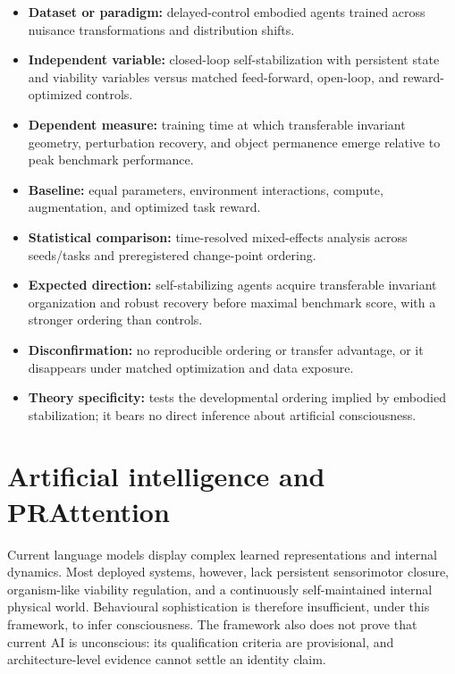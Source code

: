 \documentclass[
  11pt,
  a4paper,
]{article}
\providecommand{\tightlist}{%
  \setlength{\itemsep}{0pt}\setlength{\parskip}{0pt}}
\begin{document}
\begin{itemize}
\tightlist
\item
  \textbf{Dataset or paradigm:} delayed-control embodied agents trained
  across nuisance transformations and distribution shifts.
\item
  \textbf{Independent variable:} closed-loop self-stabilization with
  persistent state and viability variables versus matched feed-forward,
  open-loop, and reward-optimized controls.
\item
  \textbf{Dependent measure:} training time at which transferable
  invariant geometry, perturbation recovery, and object permanence
  emerge relative to peak benchmark performance.
\item
  \textbf{Baseline:} equal parameters, environment interactions,
  compute, augmentation, and optimized task reward.
\item
  \textbf{Statistical comparison:} time-resolved mixed-effects analysis
  across seeds/tasks and preregistered change-point ordering.
\item
  \textbf{Expected direction:} self-stabilizing agents acquire
  transferable invariant organization and robust recovery before maximal
  benchmark score, with a stronger ordering than controls.
\item
  \textbf{Disconfirmation:} no reproducible ordering or transfer
  advantage, or it disappears under matched optimization and data
  exposure.
\item
  \textbf{Theory specificity:} tests the developmental ordering implied
  by embodied stabilization; it bears no direct inference about
  artificial consciousness.
\end{itemize}

\section{Artificial intelligence and
PRAttention}\label{artificial-intelligence-and-prattention}

Current language models display complex learned representations and
internal dynamics. Most deployed systems, however, lack persistent
sensorimotor closure, organism-like viability regulation, and a
continuously self-maintained internal physical world. Behavioural
sophistication is therefore insufficient, under this framework, to infer
consciousness. The framework also does not prove that current AI is
unconscious: its qualification criteria are provisional, and
architecture-level evidence cannot settle an identity claim.
\end{document}
